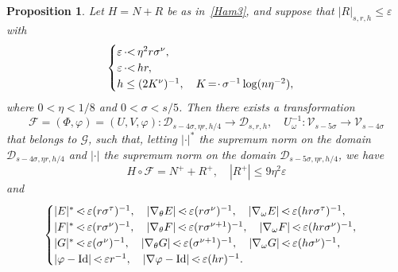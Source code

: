 \documentclass[JEP,XML,SOM,Unicode]{cedram}
\let\mathcal\mathscr
\numberwithin{equation}{section}
\theoremstyle{plain}
\newtheorem{proposition}[theorem]{Proposition}
\theoremstyle{definition}
\newcommand\MP{\,{<\hspace{-.5em}\cdot}\,}
\newcommand\PM{\,{\cdot\hspace{-.3em}<}\,}
\newcommand\EP{\,{=\hspace{-.2em}\cdot}\,}
\begin{document}
\begin{proposition}\label{Pos}
Let $H=N+R$ be as in~\eqref{Ham3}, and suppose that $|R|_{s,r,h} \leq \varepsilon$ with
\begin{equation}\label{seuil}
\begin{cases}
\varepsilon \PM \eta^2 r \sigma^{\nu}, \\
\varepsilon \PM h r, \\
h \leq (2K^{\nu})^{-1}, \quad K\EP \sigma^{-1}\log(n\eta^{-2}),
\end{cases}
\end{equation}
where $0<\eta<1/8$ and $0<\sigma<s/5$. Then there exists a transformation
\[ \mathcal{F}=(\Phi,\varphi)=(U,V,\varphi) : \mathcal{D}_{s-4\sigma,\eta r,h/4} \to \mathcal{D}_{s,r,h}, \quad U_\omega^{-1} : \mathcal{V}_{s-5\sigma} \to \mathcal{V}_{s-4\sigma}\]
that belongs to $\mathcal{G}$, such that, letting $|{\cdot}|^*$ the supremum norm on the domain $\mathcal{D}_{s-4\sigma,\eta r,h/4}$ and $|{\cdot}|$ the supremum norm on the domain $\mathcal{D}_{s-5\sigma,\eta r,h/4}$, we have
\begin{equation}\label{estim1}
H \circ \mathcal{F}=N^++R^+, \quad |R^+| \leq 9\eta^2\varepsilon
\end{equation}
and
\begin{equation}\label{estim2}
\begin{cases}
|E|^* \MP \varepsilon(r\sigma^\tau)^{-1}, \quad |\nabla_\theta E| \MP \varepsilon(r\sigma^\nu)^{-1}, \quad |\nabla_\omega E| \MP \varepsilon(h r\sigma^\tau)^{-1},\\
|F|^* \MP \varepsilon(r\sigma^\nu)^{-1}, \quad |\nabla_\theta F| \MP \varepsilon(r\sigma^{\nu+1})^{-1}, \quad |\nabla_\omega F| \MP \varepsilon(h r\sigma^\nu)^{-1}, \\
|G|^* \MP \varepsilon(\sigma^\nu)^{-1}, \quad |\nabla_\theta G| \MP \varepsilon(\sigma^{\nu+1})^{-1}, \quad |\nabla_\omega G| \MP \varepsilon(h \sigma^\nu)^{-1}, \\
|\varphi-\mathrm{Id}| \MP \varepsilon r^{-1}, \quad |\nabla \varphi-\mathrm{Id}| \MP \varepsilon (h r)^{-1}.
\end{cases}
\end{equation}

\end{proposition}
\end{document}
